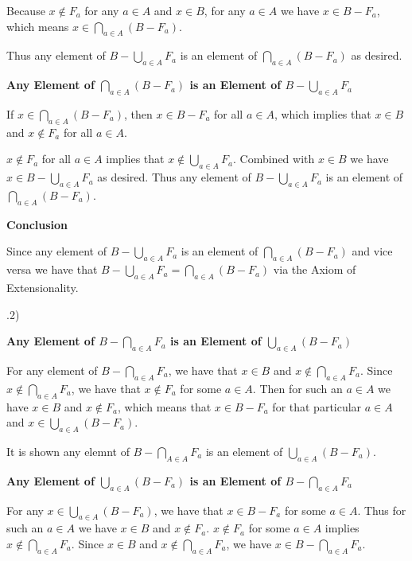 \documentclass{article}
\begin{document}
\medskip
Because $x \notin F_a$ for any $a \in A$ and $x \in B$, for any $a \in A$ we have $x \in B - F_a$, which means $x \in \bigcap_{a \in A}(B - F_a)$.

\medskip
Thus any element of $B - \bigcup_{a \in A}F_a$ is an element of $\bigcap_{a \in A}(B - F_a)$ as desired.

\medskip
\textbf{Any Element of $\bigcap_{a \in A}(B - F_a)$ is an Element of $B - \bigcup_{a \in A}F_a$}
\medskip

If $x \in \bigcap_{a \in A}(B - F_a)$, then $x \in B - F_a$ for all $a \in A$, which implies that $x \in B$ and $x \notin F_a$ for all $a \in A$.

\medskip
$x \notin F_a$ for all $a \in A$ implies that $x \notin \bigcup_{a \in A}F_a$. Combined with $x \in B$ we have $x \in B - \bigcup_{a \in A}F_a$ as desired. Thus any element of $B - \bigcup_{a \in A}F_a$ is an element of $\bigcap_{a \in A}(B - F_a)$.

\medskip
\textbf{Conclusion}
\medskip

Since any element of $B - \bigcup_{a \in A}F_a$ is an element of $\bigcap_{a \in A}(B - F_a)$ and vice versa we have that $B - \bigcup_{a \in A}F_a = \bigcap_{a \in A}(B - F_a)$ via the Axiom of Extensionality.

.2)

\medskip
\textbf{Any Element of $B - \bigcap_{a \in A}F_a$ is an Element of $\bigcup_{a \in A}(B - F_a)$}
\medskip

For any element of $B - \bigcap_{a \in A}F_a$, we have that $x \in B$ and $x \notin \bigcap_{a \in A}F_a$. Since $x \notin \bigcap_{a \in A}F_a$, we have that $x \notin F_a$ for some $a \in A$. Then for such an $a \in A$ we have $x \in B$ and $x \notin F_a$, which means that $x \in B - F_a$ for that particular $a \in A$ and $x \in \bigcup_{a \in A}(B - F_a)$.

\medskip
It is shown any elemnt of $B - \bigcap_{A \in A}F_a$ is an element of $\bigcup_{a \in A}(B - F_a)$.

\newpage
\textbf{Any Element of $\bigcup_{a \in A}(B - F_a)$ is an Element of $B - \bigcap_{a \in A}F_a$}
\medskip

For any $x \in \bigcup_{a \in A}(B - F_a)$, we have that $x \in B - F_a$ for some $a \in A$. Thus for such an $a \in A$ we have $x \in B$ and $x \notin F_a$. $x \notin F_a$ for some $a \in A$ implies $x \notin \bigcap_{a \in A}F_a$. Since $x \in B$ and $x \notin \bigcap_{a \in A}F_a$, we have $x \in B - \bigcap_{a \in A}F_a$.
\end{document}
